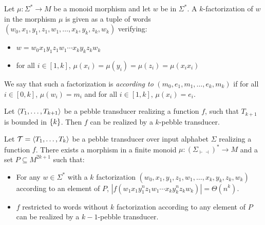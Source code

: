 
\begin{definition}
    Let $\mu:\Sigma^*\rightarrow M$ be a monoid morphism and let $w$ be in $ \Sigma^*$.
    A $k$-factorization of $w$ in the morphism $\mu$ is given as a tuple of words $(w_0,x_{1},y_1,z_1,w_1,\ldots,x_k,y_k,z_k, w_k)$ verifying:
    \begin{itemize}   
        \item  $w=w_0x_1y_1z_1w_1\cdots x_ky_kz_kw_k$
        \item for all $i\in [1,k]$, $\mu(x_i)=\mu(y_i)=\mu(z_i)=\mu(x_ix_i)$
    \end{itemize}
    We say that such a factorization is \emph{according to} $(m_0,e_1,m_1,\ldots,e_k,m_k)$ if for all $i\in [0,k]$, $\mu(w_i)=m_i$ and for all $i\in [1,k]$, $\mu(x_{i})=e_i$.
\end {definition}




\begin{comment}
\begin{lemma}
Let $\Tt=\tuple{T_k,\ldots,T_1}$ be a $k$-pebble transducer over input alphabet $\Sigma$.
One can obtain a new $k$-pebble transducer $\Tt'=\tuple{T_k',\ldots,T_1'}$ over $\Sigma'=\Sigma\times L $ such that:
\begin{itemize}
\item for any $w\in \Sigma'^*$, $\Tt'(w)=\Tt\circ\pi_{\Sigma}(w)$
\item For any $\bigcup_{j<k} Q_j'$-producing triple $(w_1,w_2,w_3)$, we have $\Tt'(w_1w_2^kw_3)=\Theta(|w_2|^k)$
\end{itemize}

\end{lemma}
\end{comment}

\begin{lemma} 
    \label{lem:bounded}
    Let $\langle T_1,\ldots,T_{k+1} \rangle$ be a pebble transducer realizing a function $f$, such that $T_{k+1}$ is bounded in $\{k\}$. Then $f$ can be realized by a $k$-pebble transducer.
\end{lemma}     

\begin{lemma}\label{lem:name}
    Let ${\mathcal T}=\langle T_1,\ldots,T_k \rangle$ be a pebble transducer over input alphabet $\Sigma$ realizing a function $f$.
    There exists a morphism in a finite monoid $\mu:(\Sigma_{\vdash\dashv})^*\rightarrow M$ and a set $P\subseteq M^{2k+1}$ such that:
    \begin{itemize}
    \item For any $w\in \Sigma^*$ with a $k$ factorization 
    $(w_0,x_{1},y_1,z_1,w_1,\ldots,x_k,y_k,z_k, w_k)$ according to an element of $P$, $|f(w_1x_1y_{1}^nz_1w_1\cdots x_ky_k^nz_kw_k)|=\Theta(n^k)$.
    \item $f$ restricted to words without $k$ factorization according to any element of $P$ can be realized by a $k{-}1$-pebble transducer.
    \end{itemize}
    
\end{lemma}




